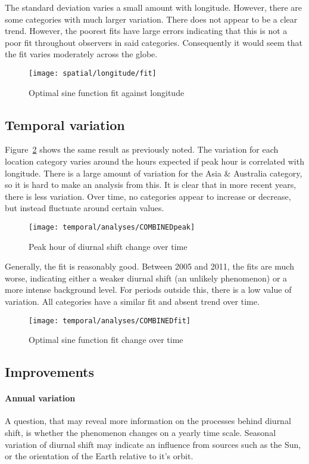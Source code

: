 The standard deviation varies a small amount with longitude. However, there are some categories with much larger variation. There does not appear to be a clear trend.  However, the poorest fits have large errors indicating that this is not a poor fit throughout observers in said categories. Consequently it would seem that the fit varies moderately across the globe. 
\begin{figure}[h!]
	\centering
	\texttt{[image: spatial/longitude/fit]}
	\caption{Optimal sine function fit against longitude
		\label{fig:dishift:lon:fit}}
\end{figure}


\subsection{Temporal variation}
Figure~\ref{fig:dishift:temp:peak} shows the same result as previously noted. The variation for each location category varies around the hours expected if peak hour is correlated with longitude. There is a large amount of variation for the Asia \& Australia category, so it is hard to make an analysis from this. It is clear that in more recent years, there is less variation. Over time, no categories appear to increase or decrease, but instead fluctuate around certain values.
\begin{figure}[h!]
	\centering
	\texttt{[image: temporal/analyses/COMBINEDpeak]}
	\caption{Peak hour of diurnal shift change over time
		\label{fig:dishift:temp:peak}}
\end{figure}
Generally, the fit is reasonably good. Between 2005 and 2011, the fits are much worse, indicating either a weaker diurnal shift (an unlikely phenomenon) or a more intense background level. For periods outside this, there is a low value of variation. All categories have a similar fit and absent trend over time.
\begin{figure}[h!]
	\centering
	\texttt{[image: temporal/analyses/COMBINEDfit]}
	\caption{Optimal sine function fit change over time
		\label{fig:dishift:temp:fit}}
\end{figure}
\subsection{Improvements}
\paragraph{Annual variation\\}
A question, that may reveal more information on the processes behind diurnal shift, is whether the phenomenon changes on a yearly time scale. Seasonal variation of diurnal shift may indicate an influence from sources such as the Sun, or the orientation of the Earth relative to it's orbit.
